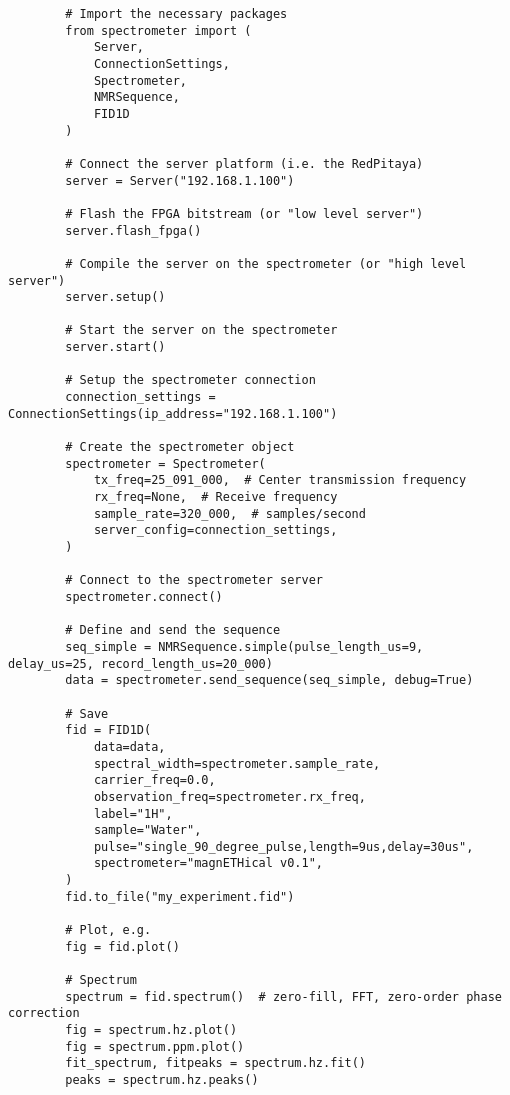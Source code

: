 \begin{listing}[h!bt]
    \begin{verbatim}
        # Import the necessary packages
        from spectrometer import (
            Server,
            ConnectionSettings,
            Spectrometer,
            NMRSequence,
            FID1D
        )

        # Connect the server platform (i.e. the RedPitaya)
        server = Server("192.168.1.100")

        # Flash the FPGA bitstream (or "low level server")
        server.flash_fpga()

        # Compile the server on the spectrometer (or "high level server")
        server.setup()

        # Start the server on the spectrometer
        server.start()

        # Setup the spectrometer connection
        connection_settings = ConnectionSettings(ip_address="192.168.1.100")

        # Create the spectrometer object
        spectrometer = Spectrometer(
            tx_freq=25_091_000,  # Center transmission frequency
            rx_freq=None,  # Receive frequency
            sample_rate=320_000,  # samples/second
            server_config=connection_settings,
        )

        # Connect to the spectrometer server
        spectrometer.connect()

        # Define and send the sequence
        seq_simple = NMRSequence.simple(pulse_length_us=9, delay_us=25, record_length_us=20_000)
        data = spectrometer.send_sequence(seq_simple, debug=True)

        # Save
        fid = FID1D(
            data=data,
            spectral_width=spectrometer.sample_rate,
            carrier_freq=0.0,
            observation_freq=spectrometer.rx_freq,
            label="1H",
            sample="Water",
            pulse="single_90_degree_pulse,length=9us,delay=30us",
            spectrometer="magnETHical v0.1",
        )
        fid.to_file("my_experiment.fid")

        # Plot, e.g.
        fig = fid.plot()

        # Spectrum
        spectrum = fid.spectrum()  # zero-fill, FFT, zero-order phase correction
        fig = spectrum.hz.plot()
        fig = spectrum.ppm.plot()
        fit_spectrum, fitpeaks = spectrum.hz.fit()
        peaks = spectrum.hz.peaks()
    \end{verbatim}
    \caption{. The hardware is assumed to be set up, connected and powered up. The \qty{5}{\milli\metre} NMR tube with the sample should be inside the probe holder that was inserted into the magnet and the connection between the RedPitaya and the Laptop running the control software was verified. The code sends a single pulse of \qty{9}{\micro\second}, waits for \qty{25}{\micro\second}, records the received signal and plots it in the time and frequency domains.}
    \label{lst:demo}
\end{listing}

